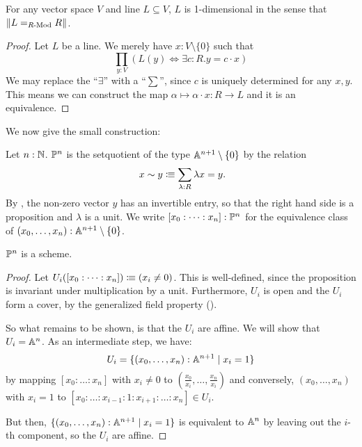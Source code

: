 \begin{proposition}%
  \label{lines-are-one-dimensional}
  For any vector space $V$ and line $L\subseteq V$,
  $L$ is 1-dimensional in the sense that $\lVert L=_{R\text{-}\mathrm{Mod}}R \rVert$.
\end{proposition}

\begin{proof}
  Let $L$ be a line.
  We merely have $x:V\setminus\{0\}$ such that 
  \[ \prod_{y:V}\left(L (y) \Leftrightarrow \exists c:R.y=c\cdot x\right)\]
  We may replace the ``$\exists$'' with a ``$\sum$'',
  since $c$ is uniquely determined for any $x,y$.
  This means we can construct the map $\alpha\mapsto \alpha\cdot x:R\to L$ and it is an equivalence.
\end{proof}

We now give the small construction:

\begin{definition}%
  \label{projective-space-hit}
  Let $n:\mathbb{N}$.
   $\mathbb{P}^n$ is the setquotient of the type $\mathbb{A}^{n+1}\setminus\{0\}$ by the relation
  \[
    x \sim y \colonequiv \sum_{\lambda : R} \lambda x=y\rlap{.}
  \]
  By , the non-zero vector $y$ has an invertible entry,
  so that the right hand side is a proposition and $\lambda$ is a unit.
  We write $[x_0:\dots:x_n]:\mathbb{P}^n$ for the equivalence class of $(x_0,\dots,x_n):\mathbb{A}^{n+1}\setminus\{0\}$.
\end{definition}

\begin{theorem}%
  \label{projective-space-is-scheme}
  $\mathbb{P}^n$ is a scheme.
\end{theorem}

\begin{proof}
  Let $U_i([x_0:\dots:x_n])\vcentcolon\mspace{-1.2mu}\equiv (x_i\neq 0)$.
  This is well-defined, since the proposition is invariant under multiplication by a unit.
  Furthermore, $U_i$ is open and the $U_i$ form a cover,
  by the generalized field property
  ().

  So what remains to be shown, is that the $U_i$ are affine.
  We will show that $U_i=\mathbb{A}^n$.
  As an intermediate step, we have:
  \[
    U_i=\{(x_0,\dots,x_n):\mathbb{A}^{n+1}\mid x_i=1\}
  \]
  by mapping $[x_0:\dots:x_n]$ with $x_i\neq 0$
  to $\left(\frac{x_0}{x_i},\dots,\frac{x_n}{x_i}\right)$
  and conversely, $(x_0,\dots,x_n)$ with $x_i=1$ to $[x_0:\dots:x_{i-1}:1:x_{i+1}:\dots:x_n]\in U_i$.

  But then, $\{(x_0,\dots,x_n):\mathbb{A}^{n+1}\mid x_i=1\}$
  is equivalent to $\mathbb{A}^n$ by leaving out the $i$-th component,
  so the $U_i$ are affine.
\end{proof}

